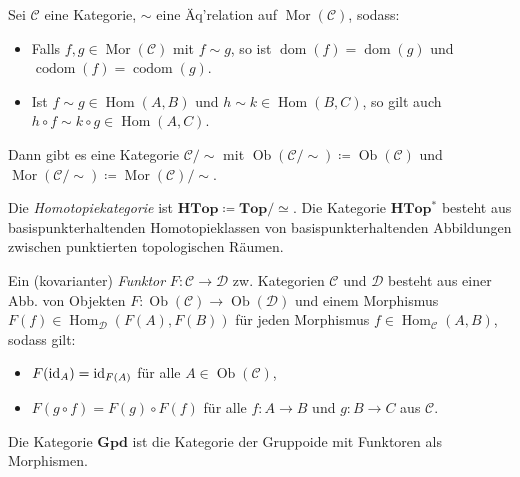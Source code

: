 \documentclass{cheat-sheet}
\DeclareMathOperator{\Ob}{Ob} %
\DeclareMathOperator{\Hom}{Hom} %
\DeclareMathOperator{\Mor}{Mor} %
\DeclareMathOperator{\dom}{dom} %
\DeclareMathOperator{\codom}{codom} %
\begin{document}
\begin{bem}
  Sei $\mathcal{C}$ eine Kategorie, ${\sim}$ eine Äq'relation auf $\Mor(\mathcal{C})$, sodass:
  \begin{itemize}
    \item Falls $f, g \in \Mor(\mathcal{C})$ mit $f \sim g$, so ist $\dom(f) = \dom(g)$ und $\codom(f) = \codom(g)$.
    \item Ist $f \sim g \in \Hom(A, B)$ und $h \sim k \in \Hom(B, C)$, so gilt auch $h \circ f \sim k \circ g \in \Hom(A, C)$.
  \end{itemize}
  Dann gibt es eine Kategorie $\mathcal{C}/{\sim}$ mit $\Ob(\mathcal{C}/{\sim}) \coloneqq \Ob(\mathcal{C})$ und $\Mor(\mathcal{C}/{\sim}) \coloneqq \Mor(\mathcal{C})/{\sim}$.
\end{bem}

\begin{defn}
  Die \emph{Homotopiekategorie} ist $\mathbf{HTop} \coloneqq \mathbf{Top} / {\simeq}$.
  Die Kategorie $\mathbf{HTop^*}$ besteht aus basispunkterhaltenden Homotopieklassen von basispunkterhaltenden Abbildungen zwischen punktierten topologischen Räumen.
\end{defn}


\begin{defn}
  Ein (kovarianter) \emph{Funktor} $F : \mathcal{C} \to \mathcal{D}$ zw. Kategorien $\mathcal{C}$ und $\mathcal{D}$ besteht aus einer Abb. von Objekten $F : \Ob(\mathcal{C}) \to \Ob(\mathcal{D})$ und einem Morphismus $F(f) \in \Hom_{\mathcal{D}}(F(A), F(B))$ für jeden Morphismus $f \in \Hom_{\mathcal{C}}(A, B)$, sodass gilt:
  \begin{itemize}
    \item $F(\mathrm{id}_A) = \mathrm{id}_{F(A)}$ für alle $A \in \Ob(\mathcal{C})$,
    \item $F(g \circ f) = F(g) \circ F(f)$ für alle $f : A \to B$ und $g : B \to C$ aus $\mathcal{C}$.
  \end{itemize}
\end{defn}

\begin{defn}
  Die Kategorie $\mathbf{Gpd}$ ist die Kategorie der Gruppoide mit Funktoren als Morphismen.
\end{defn}
\end{document}
